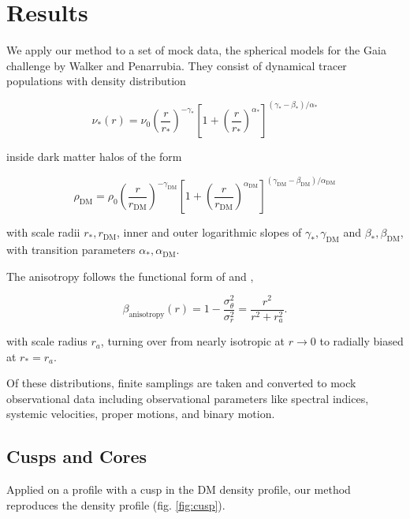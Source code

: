\section{Results}\label{sec:results}

We apply our method to a set of mock data, the spherical models
for the Gaia challenge by Walker and Penarrubia. They consist of
dynamical tracer populations with density distribution

\begin{equation}
    \nu_*(r) = \nu_0\left(\frac{r}{r_*}\right)^{-\gamma_*} \left[1+\left(\frac{r}{r_*}\right)^{\alpha_*}\right]^{(\gamma_*-\beta_*)/\alpha_*}
\end{equation}

inside dark matter halos of the form

\begin{equation}
    \rho_{\text{DM}} = \rho_0\left(\frac{r}{r_{\text{DM}}}\right)^{-\gamma_{\text{DM}}}\left[1+\left(\frac{r}{r_{\text{DM}}}\right)^{\alpha_{\text{DM}}}\right]^{(\gamma_{\text{DM}}-\beta_{\text{DM}})/\alpha_{\text{DM}}}
\end{equation}

with scale radii $r_*, r_\text{DM}$, inner and outer logarithmic
slopes of $\gamma_*, \gamma_{\text{DM}}$ and
$\beta_*,\beta_{\text{DM}}$, with transition parameters $\alpha_*,
\alpha_{\text{DM}}$.

The anisotropy follows the functional form of \citet{Osipkov1979} and
\citet{Merritt1985},

\begin{equation}
    \beta_{\text{anisotropy}}(r)=1-\frac{\sigma_\theta^2}{\sigma_r^2} = \frac{r^2}{r^2+r_a^2}.
\end{equation}

with scale radius $r_a$, turning over from nearly isotropic at $r\to
0$ to radially biased at $r_*=r_a$.

Of these distributions, finite samplings are taken and converted to
mock observational data including observational parameters like
spectral indices, systemic velocities, proper motions, and binary
motion.



\subsection{Cusps and Cores}

Applied on a profile with a cusp in the DM density profile, our method
reproduces the density profile (fig. \ref{fig:cusp}).

